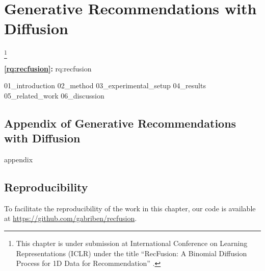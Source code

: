 
\acresetall

\chapter{Generative Recommendations with Diffusion}
\label{chapter:research-recfusion}

\footnote[]{This chapter is under submission at International Conference on Learning Representations (ICLR) under the title ``RecFusion: A Binomial Diffusion Process for 1D Data for Recommendation'' \cite{recfusion}.}
\acresetall


\medskip
\noindent
\textbf{\ref{rq:recfusion}:} \acl{rq:recfusion}
\medskip

\noindent

{01_introduction}
{02_method}
{03_experimental_setup}
{04_results}
{05_related_work}
{06_discussion}

\begin{appendices}
\chapter{Appendix of Generative Recommendations with Diffusion}
{appendix}
\end{appendices}

%

%

%
%
%
%
%
%
%
%
%



\section*{Reproducibility}
To facilitate the reproducibility of the work in this chapter, our code is available at \url{https://github.com/gabriben/recfusion}.









